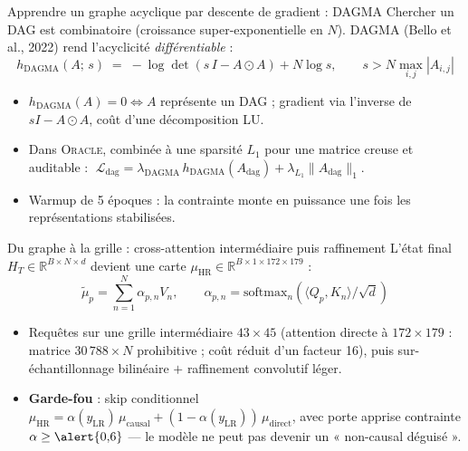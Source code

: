 \documentclass[aspectratio=169,10pt]{beamer}
\newcommand{\Oracle}{\textsc{Oracle}}
\newcommand{\LR}{\mathrm{LR}}
\newcommand{\HR}{\mathrm{HR}}
\newcommand{\muHR}{\mu_{\HR}}
\newcommand{\Adag}{A_{\mathrm{dag}}}
\newcommand{\yLR}{y_{\LR}}
\newcommand{\HT}{H_T}
\begin{document}
\begin{frame}{Apprendre un graphe acyclique par descente de gradient : DAGMA}
  Chercher un DAG est combinatoire (croissance super-exponentielle en $N$).
  DAGMA (Bello et al., 2022) rend l'acyclicité \emph{différentiable} :
  \begin{equation*}
    h_{\mathrm{DAGMA}}(A;\, s) \;=\; -\log \det\!\left( s\,I - A \odot A \right) + N \log s,
    \qquad s > N \max_{i,j} |A_{i,j}|
  \end{equation*}
  \begin{itemize}
    \item $h_{\mathrm{DAGMA}}(A) = 0 \iff A$ représente un DAG ;
          gradient via l'inverse de $sI - A\odot A$, coût d'une décomposition LU.
    \item Dans \Oracle{}, combinée à une sparsité $L_1$ pour une matrice
          \alert{creuse et auditable} :
          $\;\mathcal{L}_{\mathrm{dag}} = \lambda_{\mathrm{DAGMA}}\, h_{\mathrm{DAGMA}}(\Adag) + \lambda_{L_1} \|\Adag\|_1$.
    \item Warmup de 5 époques : la contrainte monte en puissance une fois les
          représentations stabilisées.
  \end{itemize}
\end{frame}

\begin{frame}{Du graphe à la grille : cross-attention intermédiaire puis raffinement}
  L'état final $\HT \in \mathbb{R}^{B \times N \times d}$ devient une carte
  $\muHR \in \mathbb{R}^{B \times 1 \times 172 \times 179}$ :
  \begin{equation*}
    \tilde{\mu}_p = \sum_{n=1}^{N} \alpha_{p,n} V_n,
    \qquad
    \alpha_{p,n} = \mathrm{softmax}_n\!\left( \langle Q_p, K_n \rangle / \sqrt{d} \right)
  \end{equation*}
  \begin{itemize}
    \item Requêtes sur une grille intermédiaire $43\times 45$ (attention directe à
          $172\times179$ : matrice $30\,788 \times N$ prohibitive ; coût réduit
          d'un facteur 16), puis sur-échantillonnage bilinéaire $+$ raffinement
          convolutif léger.
    \item \textbf{Garde-fou} : skip conditionnel
          $\muHR = \alpha(\yLR)\,\mu_{\mathrm{causal}} + (1-\alpha(\yLR))\,\mu_{\mathrm{direct}}$,
          avec porte apprise contrainte $\alpha \geq \alert{0{,}6}$ --- le modèle ne peut
          pas devenir un « non-causal déguisé ».
  \end{itemize}
\end{frame}
\end{document}
